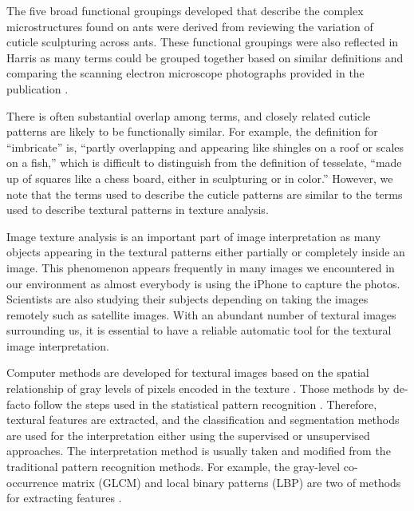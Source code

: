 \documentclass{aci}
\numberwithin{equation}{section}
\begin{document}
The five broad functional groupings developed that describe the complex
microstructures found on ants were derived from reviewing the variation of
cuticle sculpturing across ants. These functional groupings were also reflected
in Harris as many terms could be grouped together based on similar definitions
and comparing the scanning electron microscope photographs provided in the
publication \cite{harris_glossary_1979}.

There is often substantial overlap among terms, and closely related cuticle
patterns are likely to be functionally similar. For example, the definition for
“imbricate” is, “partly overlapping and appearing like shingles on a roof or
scales on a fish,” which is difficult to distinguish from the definition of
tesselate, “made up of squares like a chess board, either in sculpturing or in
color.” However, we note that the terms used to describe the cuticle patterns
are similar to the terms used to describe textural patterns in texture analysis.


Image texture analysis is an important part of image interpretation as many
objects appearing in the textural patterns either partially or completely inside
an image. This phenomenon appears frequently in many images we encountered in
our environment as almost everybody is using the iPhone to capture the photos.
Scientists are also studying their subjects depending on taking the images
remotely such as satellite images. With an abundant number of textural images
surrounding us, it is essential to have a reliable automatic tool for the
textural image interpretation.

Computer methods are developed for textural images based on the spatial
relationship of gray levels of pixels encoded in the texture
\cite{haralick_image_1985,hung_image_2019}. Those methods by de-facto follow the
steps used in the statistical pattern recognition
\cite{fukunaga_introduction_2013}. Therefore, textural features are extracted,
and the classification and segmentation methods are used for the interpretation
either using the supervised or unsupervised approaches. The interpretation
method is usually taken and modified from the traditional pattern recognition
methods. For example, the gray-level co-occurrence matrix (GLCM) and local
binary patterns (LBP) are two of methods for extracting features
\cite{haralick_textural_1973, goos_gray_2000}.
\end{document}
